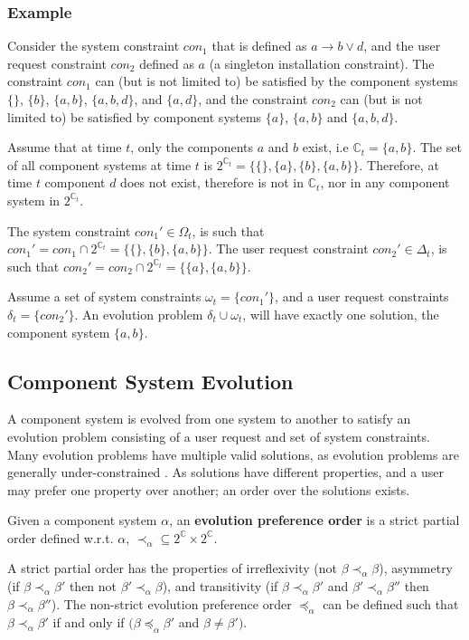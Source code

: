 \subsubsection{Example}
Consider the system constraint $con_1$ that is defined as $a \rightarrow b \vee d$, and the user request constraint $con_2$ defined as $a$ (a singleton installation constraint).
The constraint $con_1$ can (but is not limited to) be satisfied by the component systems $\{\}$, $\{b\}$, $\{a,b\}$, $\{a,b,d\}$, and $\{a,d\}$,
and the constraint $con_2$ can (but is not limited to) be satisfied by component systems $\{a\}$, $\{a,b\}$ and $\{a,b,d\}$.

Assume that at time $t$, only the components $a$ and $b$ exist, i.e $\mathbb{C}_{t} = \{a,b\}$.
The set of all component systems at time $t$ is $2^{\mathbb{C}_{t}} = \{\{\},\{a\},\{b\},\{a,b\}\}$.
Therefore, at time $t$ component $d$ does not exist, therefore is not in $\mathbb{C}_{t}$, nor in any component system in $2^{\mathbb{C}_{t}}$.

The system constraint $con_1' \in \Omega_{t}$, is such that $con_1' = con_1 \cap 2^{\mathbb{C}_{t}} = \{\{\},\{b\},\{a,b\}\}$.
The user request constraint $con_2' \in \Delta_{t}$, is such that $con_2' = con_2 \cap 2^{\mathbb{C}_{t}} = \{\{a\},\{a,b\}\}$.

Assume a set of system constraints $\omega_{t} = \{con_1'\}$, and a user request constraints $\delta_{t} = \{con_2'\}$.
An evolution problem $\delta_{t} \cup \omega_{t}$, will have exactly one solution, the component system $\{a,b\}$.  

\subsection{Component System Evolution}
\label{formal.evo}
A component system is evolved from one system to another to satisfy an evolution problem consisting of a user request and set of system constraints.
Many evolution problems have multiple valid solutions, as evolution problems are generally under-constrained \citep{Berre2008}.
As solutions have different properties, and a user may prefer one property over another; an order over the solutions exists.  

\begin{defs}
Given a component system $\alpha$, an \textbf{evolution preference order} is a strict partial order defined w.r.t. $\alpha$,  $\prec_{\alpha} \subseteq 2^{\mathbb{C}} \times 2^{\mathbb{C}}$.
\end{defs}
A strict partial order has the properties of irreflexivity (not $\beta \prec_{\alpha} \beta$), asymmetry (if $\beta \prec_{\alpha} \beta'$ then not $\beta' \prec_{\alpha} \beta$), 
and transitivity (if $\beta \prec_{\alpha} \beta'$ and $\beta' \prec_{\alpha} \beta''$ then $\beta \prec_{\alpha} \beta''$).
The non-strict evolution preference order $\preceq_{\alpha}$ can be defined such that $\beta \prec_{\alpha} \beta'$ if and only if $(\beta \preceq_{\alpha} \beta'$ and $\beta \neq \beta')$. 

